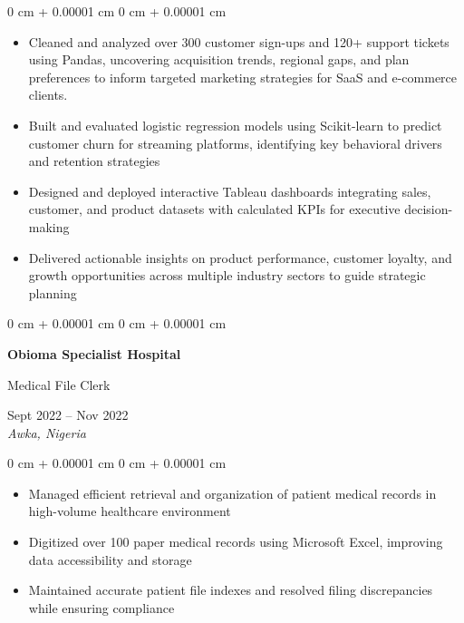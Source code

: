 \documentclass[10pt, a4paper]{article}
\newenvironment{highlights}{
    \begin{itemize}[
        topsep=0.10 cm,
        parsep=0.10 cm,
        partopsep=0pt,
        itemsep=0pt,
        leftmargin=20pt
    ]
}{
    \end{itemize}
} %
\newenvironment{onecolentry}{
    \begin{adjustwidth}{
        0 cm + 0.00001 cm
    }{
        0 cm + 0.00001 cm
    }
}{
    \end{adjustwidth}
} %
\newenvironment{twocolentry}[2][]{
    \onecolentry
    \def\secondColumn{#2}
    \setcolumnwidth{\fill, 4.5 cm}
    \begin{paracol}{2}
}{
    \switchcolumn \raggedleft \secondColumn
    \end{paracol}
    \endonecolentry
} %
\begin{document}
    \vspace{0.10 cm}
    \begin{onecolentry}
        \begin{highlights}
            \item Cleaned and analyzed over 300 customer sign-ups and 120+ support tickets using Pandas, uncovering acquisition trends, regional gaps, and plan preferences to inform targeted marketing strategies for SaaS and e-commerce clients.
            \item Built and evaluated logistic regression models using Scikit-learn to predict customer churn for streaming platforms, identifying key behavioral drivers and retention strategies
            \item Designed and deployed interactive Tableau dashboards integrating sales, customer, and product datasets with calculated KPIs for executive decision-making
            \item Delivered actionable insights on product performance, customer loyalty, and growth opportunities across multiple industry sectors to guide strategic planning
        \end{highlights}
    \end{onecolentry}

    \vspace{0.2 cm}

    \begin{twocolentry}{
        Sept 2022 -- Nov 2022 \\
        \textit{Awka, Nigeria}
    }
        \textbf{Obioma Specialist Hospital}
        
        Medical File Clerk
    \end{twocolentry}

    \vspace{0.10 cm}
    \begin{onecolentry}
        \begin{highlights}
            \item Managed efficient retrieval and organization of patient medical records in high-volume healthcare environment
            \item Digitized over 100 paper medical records using Microsoft Excel, improving data accessibility and storage
            \item Maintained accurate patient file indexes and resolved filing discrepancies while ensuring compliance
        \end{highlights}
    \end{onecolentry}
\end{document}
